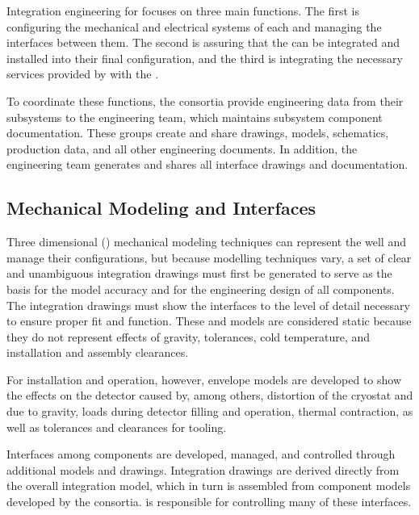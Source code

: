 Integration engineering for  focuses on three main functions. The first is configuring the
mechanical and electrical systems of each  and managing
the interfaces between them.  The second 
is assuring that the  can be integrated and
installed into their final configuration, and the third is
integrating the necessary services provided by  
with the . 

To coordinate these functions, the consortia provide engineering data from their
subsystems to the  engineering team, which maintains subsystem
component documentation.  
These groups create and share
drawings, models, schematics, production data, and all other
engineering documents. In addition, the  engineering team
generates and shares all interface drawings and documentation.
 
\subsection{Mechanical Modeling and Interfaces}
\label{sec:es-tc-mech}

Three dimensional (\threed) mechanical modeling techniques can represent the  well and manage their configurations, but because  \threed modelling techniques vary, a set
of clear and unambiguous \twod integration drawings must first be generated to serve as
the basis for the \threed model accuracy and for the engineering
design of all components. The \twod integration drawings must show the 
interfaces to the level of detail necessary to ensure proper fit and function.  These \threed and 
\twod models are considered static because they do not represent effects of gravity, tolerances, cold
temperature, and installation and assembly clearances.

For installation and operation, however, envelope models  are developed to 
show the effects on the detector 
caused by, among others, distortion of the cryostat and  due to gravity, loads  during 
detector filling and operation, thermal contraction,  as well as tolerances and clearances for tooling.

Interfaces among components are developed, managed, and controlled through additional models and drawings. 
Integration drawings are derived directly from the overall
integration model, which in turn is assembled from
component models developed by the consortia.
 is responsible for controlling many of these interfaces. 

